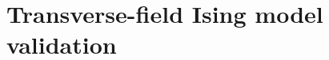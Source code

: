 \documentclass[aps,physrev,preprint,groupedaddress]{revtex4-2}
\begin{document}

\section{Transverse-field Ising model validation}\label{sm:tfising}
\end{document}
